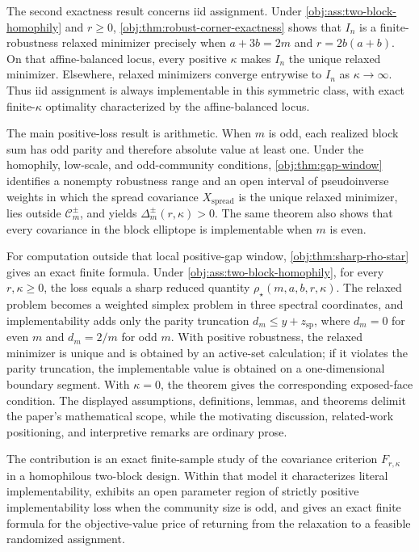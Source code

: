 The second exactness result concerns iid assignment. Under \cref{obj:ass:two-block-homophily} and \(r\ge0\), \cref{obj:thm:robust-corner-exactness} shows that \(I_n\) is a finite-robustness relaxed minimizer precisely when \(a+3b=2m\) and \(r=2b(a+b)\). On that affine-balanced locus, every positive \(\kappa\) makes \(I_n\) the unique relaxed minimizer. Elsewhere, relaxed minimizers converge entrywise to \(I_n\) as \(\kappa\to\infty\). Thus iid assignment is always implementable in this symmetric class, with exact finite-\(\kappa\) optimality characterized by the affine-balanced locus.

The main positive-loss result is arithmetic. When \(m\) is odd, each realized block sum has odd parity and therefore absolute value at least one. Under the homophily, low-scale, and odd-community conditions, \cref{obj:thm:gap-window} identifies a nonempty robustness range and an open interval of pseudoinverse weights in which the spread covariance \(X_{\mathrm{spread}}\) is the unique relaxed minimizer, lies outside \(\mathcal C_m^{\pm}\), and yields \(\Delta_m^{\pm}(r,\kappa)>0\). The same theorem also shows that every covariance in the block elliptope is implementable when \(m\) is even.

For computation outside that local positive-gap window, \cref{obj:thm:sharp-rho-star} gives an exact finite formula. Under \cref{obj:ass:two-block-homophily}, for every \(r,\kappa\ge0\), the loss equals a sharp reduced quantity \(\rho_\star(m,a,b,r,\kappa)\). The relaxed problem becomes a weighted simplex problem in three spectral coordinates, and implementability adds only the parity truncation \(d_m\le y+z_{\mathrm{sp}}\), where \(d_m=0\) for even \(m\) and \(d_m=2/m\) for odd \(m\). With positive robustness, the relaxed minimizer is unique and is obtained by an active-set calculation; if it violates the parity truncation, the implementable value is obtained on a one-dimensional boundary segment. With \(\kappa=0\), the theorem gives the corresponding exposed-face condition. The displayed assumptions, definitions, lemmas, and theorems delimit the paper's mathematical scope, while the motivating discussion, related-work positioning, and interpretive remarks are ordinary prose.

The contribution is an exact finite-sample study of the covariance criterion \(F_{r,\kappa}\) in a homophilous two-block design. Within that model it characterizes literal implementability, exhibits an open parameter region of strictly positive implementability loss when the community size is odd, and gives an exact finite formula for the objective-value price of returning from the relaxation to a feasible randomized assignment.
